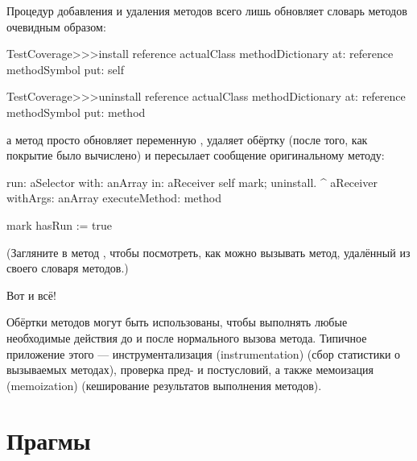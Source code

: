 \documentclass[a4paper,10pt,twoside]{book}
\begin{document}
Процедур добавления и удаления методов всего лишь обновляет словарь методов очевидным образом:
\begin{code}{}
TestCoverage>>>install
	reference actualClass methodDictionary
		at: reference methodSymbol
		put: self

TestCoverage>>>uninstall
	reference actualClass methodDictionary
		at: reference methodSymbol
		put: method
\end{code}
\noindent
а метод  просто обновляет переменную , удаляет обёртку (после того, как покрытие было вычислено) и пересылает сообщение оригинальному методу:
\begin{code}{}
run: aSelector with: anArray in: aReceiver
	self mark; uninstall.
	^ aReceiver withArgs: anArray executeMethod: method

mark
	hasRun := true
\end{code}
(Загляните в метод , чтобы посмотреть, как можно вызывать метод, удалённый из своего словаря методов.)

Вот и всё!

Обёртки методов могут быть использованы, чтобы выполнять любые необходимые действия до и после нормального вызова метода. Типичное приложение этого --- инструментализация (instrumentation) (сбор статистики о вызываемых методах), проверка пред- и постусловий, а также мемоизация (memoization) (кеширование результатов выполнения методов). 

\section{Прагмы}
\end{document}
